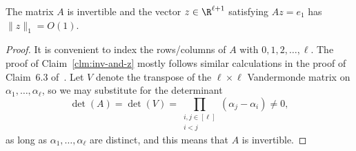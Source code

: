 \begin{claim}\label{clm:inv-and-z}
The matrix $A$ %
is invertible and the vector $z \in \R^{\ell+1}$ satisfying $A z = e_1$ has $\|z\|_1 = O(1)$.
\end{claim}

\begin{proof} It is convenient to index the rows/columns of $A$ with $0,1,2,\ldots,\ell$.
The proof of Claim~\ref{clm:inv-and-z} mostly follows similar calculations  in the proof of Claim~6.3 of~\cite{CJLW21b}. Let $V$ denote the transpose of the $\ell \times \ell$ Vandermonde matrix on $\alpha_1,\dots, \alpha_{\ell}$, so we may substitute for the determinant
\[ \det(A ) = \det(V ) = \prod_{\substack{i,j \in [\ell] \\ i < j}} (\alpha_j - \alpha_i) \neq  0,\]
as long as $\alpha_1,\dots, \alpha_{\ell}$ are distinct, and this means that $A$ is invertible. 


\end{proof}
